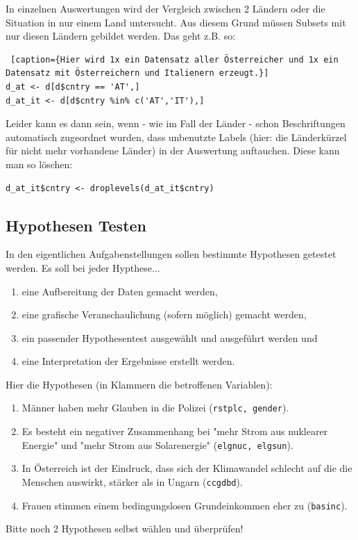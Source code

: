 \documentclass{article}
\begin{document}
In einzelnen Auswertungen wird der Vergleich zwischen 2 Ländern oder die Situation in nur einem Land untersucht. Aus diesem Grund müssen Subsets mit nur diesen Ländern gebildet werden. Das geht z.B. so: \\

 \begin{lstlisting} [caption={Hier wird 1x ein Datensatz aller Österreicher und 1x ein Datensatz mit Österreichern und Italienern erzeugt.}]
d_at <- d[d$cntry == 'AT',]
d_at_it <- d[d$cntry %in% c('AT','IT'),]
 \end{lstlisting}

Leider kann es dann sein, wenn - wie im Fall der Länder - schon Beschriftungen automatisch zugeordnet wurden, dass unbenutzte Labels (hier: die Länderkürzel für nicht mehr vorhandene Länder) in der Auswertung auftauchen. Diese kann man so löschen:

 \begin{lstlisting}
d_at_it$cntry <- droplevels(d_at_it$cntry) 
\end{lstlisting}


\subsection{Hypothesen Testen}

In den eigentlichen Aufgabenstellungen sollen bestimmte Hypothesen getestet werden. Es soll bei jeder Hypthese...
\begin{enumerate}
	\item eine Aufbereitung der Daten gemacht werden,
	\item eine grafische Veranschaulichung (sofern möglich) gemacht werden,
	\item ein passender Hypothesentest ausgewählt und ausgeführt werden und
	\item eine Interpretation der Ergebnisse erstellt werden.
\end{enumerate}


Hier die Hypothesen (in Klammern die betroffenen Variablen):


\begin{enumerate}
	\item Männer haben mehr Glauben in die Polizei (\texttt{rstplc, gender}).
	\item Es besteht ein negativer Zusammenhang bei "mehr Strom aus nuklearer Energie" und "mehr Strom aus Solarenergie" (\texttt{elgnuc, elgsun}).
	\item In Österreich ist der Eindruck, dass sich der Klimawandel schlecht auf die die Menschen auswirkt, stärker als in Ungarn (\texttt{ccgdbd}). 
	\item Frauen stimmen einem bedingungslosen Grundeinkommen eher zu (\texttt{basinc}).
\end{enumerate}

Bitte noch 2 Hypothesen selbst wählen und überprüfen!
\end{document}
